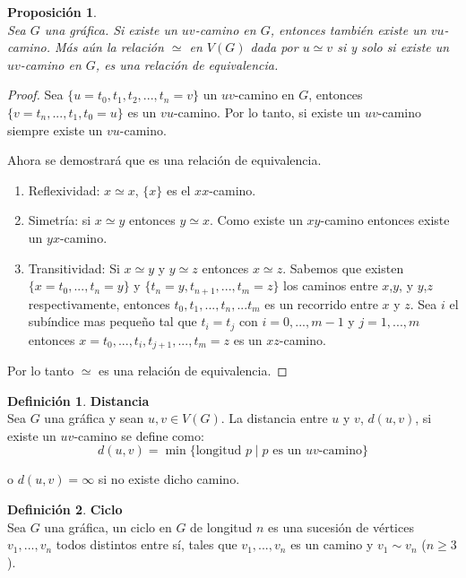 \documentclass[11pt]{book}
\newtheorem{proposition}{Proposición}
\theoremstyle{definition}
\newtheorem{definition}{Definición}
\begin{document}
\begin{proposition}\textbf{}\\
  Sea $G$ una gráfica. Si existe un $uv$-camino en $G$, entonces también existe un $vu$-camino. Más aún la
  relación $\simeq$ en $V(G)$ dada por $u\simeq v$ si y solo si existe
  un $uv$-camino en $G$, es una relación de equivalencia.
\end{proposition}
\begin{proof} Sea $\{u=t_0,t_1,t_2,...,t_n=v \}$ un $uv$-camino
en $G$, entonces $\{v=t_n,...,t_1,t_0=u \}$ es un $vu$-camino. Por lo tanto, si existe un $uv$-camino siempre existe un $vu$-camino.

 Ahora se demostrará que es una relación de equivalencia.

\begin{enumerate}

\item Reflexividad: $x\simeq x$, $\{ x\}$ es el $xx$-camino.

\item Simetría: si $x \simeq y$ entonces $y \simeq x$. Como existe un $xy$-camino entonces existe un
  $yx$-camino.

\item Transitividad: Si $x \simeq y$ y $y \simeq z$ entonces $x \simeq
  z$.  Sabemos que existen $\{x=t_0,...,t_n=y\}$ y
  $\{t_n=y,t_{n+1},...,t_m=z \}$ los caminos entre $x$,$y$, y $y$,$z$
  respectivamente, entonces $ t_0, t_1,...,t_n,...t_m$ es un recorrido
  entre $x$ y $z$. Sea $i$ el subíndice mas pequeño tal que $t_i =
  t_j$ con $i=0,...,m-1$ y $j =1,...,m$ entonces
  $x=t_0,...,t_i,t_{j+1},...,t_m=z$ es un $xz$-camino.
\end{enumerate}

Por lo tanto $\simeq$ es una relación de equivalencia.
\end{proof}

\begin{definition}\textbf{Distancia}\\
Sea $G$ una gráfica y sean $u,v\in V(G)$. La distancia entre $u$ y $v$, $d(u,v)$, si existe
  un $uv$-camino se define como:
  \begin{equation*}
    d(u,v)=\min\{ \text{longitud $p$}  \mid \text{$p$ es un $uv$-camino} \}
  \end{equation*}

  o $d(u,v)=\infty$ si no existe dicho camino.
\end{definition}

\begin{definition}\textbf{Ciclo}\\
  Sea $G$ una gráfica, un ciclo en $G$ de longitud $n$ es una sucesión
  de vértices $v_1,...,v_n$ todos distintos entre sí, tales que
  $v_1,...,v_n$ es un camino y $v_1 \sim v_n$ ($n\geq 3$).
\end{definition}
\end{document}
